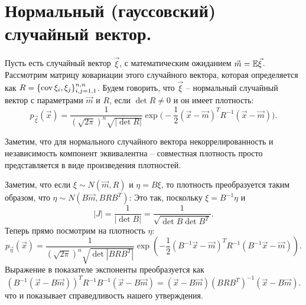 \section{Нормальный (гауссовский) случайный вектор.}
\begin{definition}
    Пусть есть случайный вектор $\vec{\xi}$, с математическим ожиданием $\vec{m} = \mathbb{E} \vec{\xi}$. \\
    Рассмотрим матрицу ковариации этого случайного вектора, которая определяется как $R = \{\operatorname{cov} \xi_i, \xi_j\}_{i, j = 1, 1}^{n, n}$.
    Будем говорить, что $\vec{\xi}$ -- нормальный случайный вектор с параметрами $\vec{m}$ и $R$, если $\det R \neq 0$ и он имеет плотность:
    \[
        p_{\vec{\xi}}(\vec{x}) = \dfrac{1}{(\sqrt {2\pi})^n \sqrt {|\det R|}} \exp\biggr( -\dfrac{1}{2}(\vec{x} - \vec{m})^T R^{-1}(\vec{x} - \vec{m}) \biggr).
    \]
\end{definition}
\begin{lemma}
    Заметим, что для нормального случайного вектора некоррелированность и независимость компонент эквивалентна -- совместная плотность просто представляется в виде произведения плотностей.
\end{lemma}
\begin{note}
    Заметим, что если $\xi \sim N(\vec{m}, R)$ и $\eta = B \xi$, то плотность преобразуется таким образом, что $\eta \sim N(B \vec{m}, BRB^T)$:
    Это так, поскольку $\xi = B^{-1}\eta$ и \[|J| = \dfrac{1}{|\det B|} = \dfrac{1}{\sqrt {\det B \det B^T}}.\]
    Теперь прямо посмотрим на плотность $\eta$:
    \[
        p_{\vec{\eta}}(\vec{x}) = \dfrac{1}{(\sqrt{2\pi})^{n} \sqrt{\det|BRB^T|}} \exp (-\dfrac{1}{2}(B^{-1}\vec{x} - \vec{m})^TR^{-1}(B^{-1}\vec{x} - \vec{m})).
    \]
    Выражение в показателе экспоненты преобразуется как
    \[
        (B^{-1}(\vec{x} - B\vec{m}))^T R^{-1} B^{-1}(\vec{x} - B\vec{m}) = (\vec{x} - B\vec{m})(BRB^T)^{-1}(\vec{x} - B\vec{m}).
    \]
    что и показывает справедливость нашего утверждения.
\end{note}
